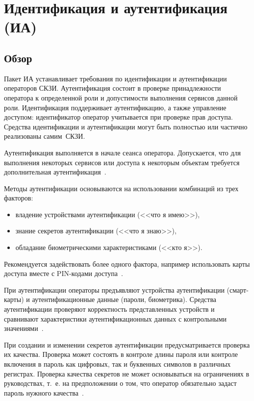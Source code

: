 \section{Идентификация и аутентификация (ИА)}\label{IA}

\subsection{Обзор}\label{IA.Intro}

Пакет ИА устанавливает требования по идентификации и аутентификации операторов 
СКЗИ. Аутентификация состоит в проверке принадлежности оператора к определенной 
роли и допустимости выполнения сервисов данной роли. Идентификация поддерживает 
аутентификацию, а также управление доступом: идентификатор оператор 
учитывается при проверке прав доступа.
%
Средства идентификации и аутентификации могут быть полностью или частично 
реализованы самим~СКЗИ.

Аутентификация выполняется в начале сеанса оператора.
Допускается, что для выполнения некоторых сервисов 
или доступа к некоторым объектам требуется дополнительная 
аутентификация~. 

Методы аутентификации основываются на использовании комбинаций из трех факторов:
\begin{itemize}
\item
владение устройствами аутентификации (<<что я имею>>), 
\item
знание секретов аутентификации (<<что я знаю>>), 
\item
обладание биометрическими характеристиками (<<кто я>>).
\end{itemize}

Рекомендуется задействовать более одного фактора, например использовать 
карты доступа вместе с PIN-кодами доступа~.

При аутентификации операторы предъявляют устройства аутентификации 
(смарт-карты) и аутентификационные данные (пароли, биометрика).
%
Средства аутентификации проверяют корректность представленных устройств и
сравнивают характеристики аутентификационных данных с контрольными 
значениями~.

При создании и изменении секретов аутентификации предусматривается проверка их
качества. Проверка может состоять в контроле длины пароля или контроле включения
в пароль как цифровых, так и буквенных символов в различных регистрах. Проверка
качества секретов не может основываться на ограничениях в руководствах, т.~е. на
предположении о том, что оператор обязательно задаст пароль нужного
качества~.

